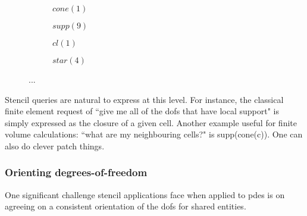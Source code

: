 
\begin{figure}
  \centering
  \begin{subfigure}{0.45\textwidth}
    \centering
    \caption{$cone(1)$}
  \end{subfigure}
  \begin{subfigure}{0.45\textwidth}
    \centering
    \caption{$supp(9)$}
  \end{subfigure}
  \begin{subfigure}{0.45\textwidth}
    \centering
    \caption{$cl(1)$}
  \end{subfigure}
  \begin{subfigure}{0.45\textwidth}
    \centering
    \caption{$star(4)$}
  \end{subfigure}

  \caption{...}
  \label{fig:plex_restrictions}
\end{figure}


Stencil queries are natural to express at this level.
For instance, the classical finite element request of ``give me all of the \glspl{dof} that have local support" is simply expressed as the closure of a given cell.
Another example useful for finite volume calculations: ``what are my neighbouring cells?" is supp(cone(c)).
One can also do clever patch things.


\subsubsection{Orienting degrees-of-freedom}

One significant challenge stencil applications face when applied to \glspl{pde} is on agreeing on a consistent orientation of the \glspl{dof} for shared entities.

